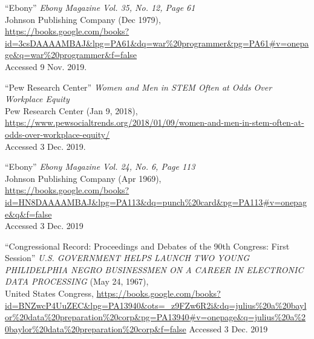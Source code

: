\documentclass[a4paper,12pt]{article}
\begin{document}
\begin{thebibliography}{9}

``Ebony'' \textit{Ebony Magazine Vol. 35, No. 12, Page 61}\\
Johnson Publishing Company (Dec 1979),\\
\url{https://books.google.com/books?id=3csDAAAAMBAJ&lpg=PA61&dq=war%20programmer&pg=PA61#v=onepage&q=war%20programmer&f=false}\\
Accessed 9 Nov. 2019.

``Pew Research Center'' \textit{Women and Men in STEM Often at Odds Over Workplace Equity} \\
Pew Research Center (Jan 9, 2018),\\
\url{https://www.pewsocialtrends.org/2018/01/09/women-and-men-in-stem-often-at-odds-over-workplace-equity/}\\
Accessed 3 Dec. 2019.

``Ebony''
\textit{Ebony Magazine Vol. 24, No. 6, Page 113} \\
Johnson Publishing Company (Apr 1969),\\
\url{https://books.google.com/books?id=HN8DAAAAMBAJ&lpg=PA113&dq=punch%20card&pg=PA113#v=onepage&q&f=false}\\
Accessed 3 Dec. 2019

``Congressional Record: Proceedings and Debates of the 90th Congress: First Session''
\textit{U.S. GOVERNMENT HELPS LAUNCH TWO YOUNG PHILIDELPHIA NEGRO BUSINESSMEN ON A CAREER IN ELECTRONIC DATA PROCESSING} (May 24, 1967),\\
United States Congress,
\url{https://books.google.com/books?id=BNZwcP4UuZEC&lpg=PA13940&ots=_z9FZw6R2i&dq=julius%20a%20baylor%20data%20preparation%20corp&pg=PA13940#v=onepage&q=julius%20a%20baylor%20data%20preparation%20corp&f=false} %
Accessed 3 Dec. 2019

\end{thebibliography}

\newpage

\end{document}
